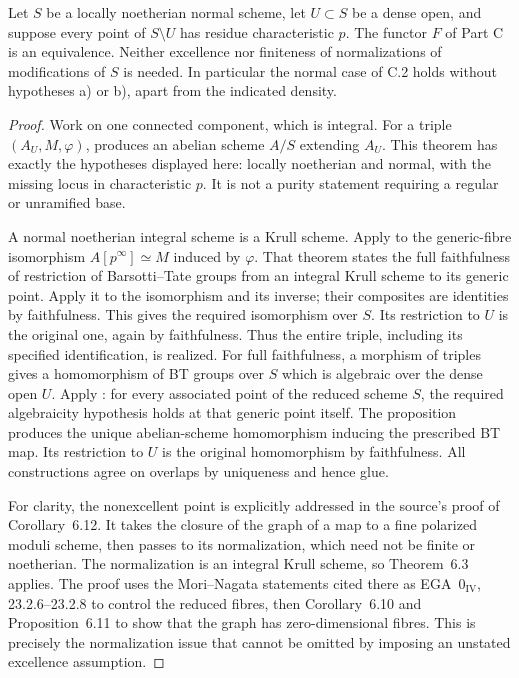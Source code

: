 \begin{theorem}\label{thm:C-RD6}
Let $S$ be a locally noetherian normal scheme, let $U\subset S$ be a dense
open, and suppose every point of $S\setminus U$ has residue
characteristic $p$. The functor $F$ of Part C is an equivalence.
Neither excellence nor finiteness of normalizations of modifications of
$S$ is needed. In particular the normal case of C.2 holds without
hypotheses a) or b), apart from the indicated density.
\end{theorem}
\begin{proof}
Work on one connected component, which is integral. For a triple
$(A_U,M,\varphi)$, \cite[Corollary~6.12]{KrishnamoorthyPal2021RankTwo}
produces an abelian scheme $A/S$ extending $A_U$. This theorem has
exactly the hypotheses displayed here: locally noetherian and normal,
with the missing locus in characteristic $p$. It is not a purity
statement requiring a regular or unramified base.

A normal noetherian integral scheme is a Krull scheme. Apply
\cite[Theorem~6.3]{KrishnamoorthyPal2021RankTwo} to the generic-fibre
isomorphism $A[p^\infty]\simeq M$ induced by $\varphi$. That theorem
states the full faithfulness of restriction of Barsotti--Tate groups
from an integral Krull scheme to its generic point. Apply it to the
isomorphism and its inverse; their composites are identities by
faithfulness. This gives the required isomorphism over $S$. Its
restriction to $U$ is the original one, again by faithfulness. Thus the
entire triple, including its specified identification, is realized.
For full faithfulness, a morphism of triples gives a homomorphism of
BT groups over $S$ which is algebraic over the dense open $U$. Apply
\cite[Proposition~1.2, p.64]{Grothendieck1966Hom}: for every associated
point of the reduced scheme $S$, the required algebraicity hypothesis
holds at that generic point itself. The proposition produces the unique
abelian-scheme homomorphism inducing the prescribed BT map. Its
restriction to $U$ is the original homomorphism by faithfulness.
All constructions agree on overlaps by uniqueness and hence glue.

For clarity, the nonexcellent point is explicitly addressed in the
source's proof of Corollary~6.12. It takes the closure of the graph of a
map to a fine polarized moduli scheme, then passes to its normalization,
which need not be finite or noetherian. The normalization is an integral
Krull scheme, so Theorem~6.3 applies. The proof uses the Mori--Nagata
statements cited there as EGA~$0_{\mathrm{IV}}$, 23.2.6--23.2.8 to
control the reduced fibres, then Corollary~6.10 and Proposition~6.11 to
show that the graph has zero-dimensional fibres. This is precisely the
normalization issue that cannot be omitted by imposing an unstated
excellence assumption.
\end{proof}

